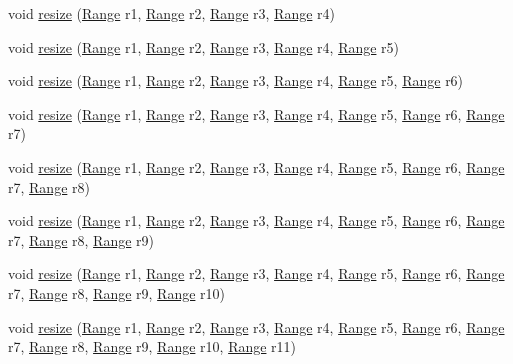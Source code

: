 \begin{DoxyCompactItemize}
void \hyperlink{classArray_a3bb8ef7913bed965d2be42d122958a8a}{resize} (\hyperlink{classRange}{Range} r1, \hyperlink{classRange}{Range} r2, \hyperlink{classRange}{Range} r3, \hyperlink{classRange}{Range} r4)
\item 
void \hyperlink{classArray_a81d3a34ab367c298b2b1f0278acb561b}{resize} (\hyperlink{classRange}{Range} r1, \hyperlink{classRange}{Range} r2, \hyperlink{classRange}{Range} r3, \hyperlink{classRange}{Range} r4, \hyperlink{classRange}{Range} r5)
\item 
void \hyperlink{classArray_aede426d3052e5ee1c447ac88db108985}{resize} (\hyperlink{classRange}{Range} r1, \hyperlink{classRange}{Range} r2, \hyperlink{classRange}{Range} r3, \hyperlink{classRange}{Range} r4, \hyperlink{classRange}{Range} r5, \hyperlink{classRange}{Range} r6)
\item 
void \hyperlink{classArray_a8219bd262073a8829bef568e838875f3}{resize} (\hyperlink{classRange}{Range} r1, \hyperlink{classRange}{Range} r2, \hyperlink{classRange}{Range} r3, \hyperlink{classRange}{Range} r4, \hyperlink{classRange}{Range} r5, \hyperlink{classRange}{Range} r6, \hyperlink{classRange}{Range} r7)
\item 
void \hyperlink{classArray_a554f2ad144a05d64f8e4edcb74c9f483}{resize} (\hyperlink{classRange}{Range} r1, \hyperlink{classRange}{Range} r2, \hyperlink{classRange}{Range} r3, \hyperlink{classRange}{Range} r4, \hyperlink{classRange}{Range} r5, \hyperlink{classRange}{Range} r6, \hyperlink{classRange}{Range} r7, \hyperlink{classRange}{Range} r8)
\item 
void \hyperlink{classArray_adba6b3b9526e8f1ca38cf0d9318267d0}{resize} (\hyperlink{classRange}{Range} r1, \hyperlink{classRange}{Range} r2, \hyperlink{classRange}{Range} r3, \hyperlink{classRange}{Range} r4, \hyperlink{classRange}{Range} r5, \hyperlink{classRange}{Range} r6, \hyperlink{classRange}{Range} r7, \hyperlink{classRange}{Range} r8, \hyperlink{classRange}{Range} r9)
\item 
void \hyperlink{classArray_aa55c2bcd27e5a61d368d5314d29f4a73}{resize} (\hyperlink{classRange}{Range} r1, \hyperlink{classRange}{Range} r2, \hyperlink{classRange}{Range} r3, \hyperlink{classRange}{Range} r4, \hyperlink{classRange}{Range} r5, \hyperlink{classRange}{Range} r6, \hyperlink{classRange}{Range} r7, \hyperlink{classRange}{Range} r8, \hyperlink{classRange}{Range} r9, \hyperlink{classRange}{Range} r10)
\item 
void \hyperlink{classArray_a60b65afca568282720f4137d608fa956}{resize} (\hyperlink{classRange}{Range} r1, \hyperlink{classRange}{Range} r2, \hyperlink{classRange}{Range} r3, \hyperlink{classRange}{Range} r4, \hyperlink{classRange}{Range} r5, \hyperlink{classRange}{Range} r6, \hyperlink{classRange}{Range} r7, \hyperlink{classRange}{Range} r8, \hyperlink{classRange}{Range} r9, \hyperlink{classRange}{Range} r10, \hyperlink{classRange}{Range} r11)

\end{DoxyCompactItemize}
